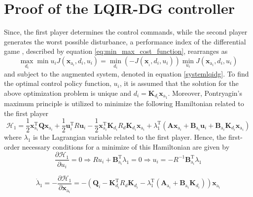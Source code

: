 \documentclass[3p]{elsarticle}
\begin{document}
\section{Proof of the LQIR-DG controller}
Since, the first player determines the control commands, while the second player generates the worst possible disturbance, a performance index of the differential game \cite{book_gth}, described by equation \eqref{eq:min_max_cost_function}, rearranges as
\begin{equation}
    \max_{d_i}\min{u_i} J(\mathbf{x}_{\mathrm{a}_i}, d_i, u_i) = \min_{d_i}\left(-J(\mathbf{x}_{_i}, d_i, u_i)\right)\min_{u_i}J(\mathbf{x}_{\mathrm{a}_i}, d_i, u_i)
\end{equation}
and subject to the augmented system, denoted in equation \eqref{systemlqidg}. To find the optimal control policy function, $u_i$, it is assumed that the solution for the above optimization problem is unique and $d_i = \mathbf{K}_{d_i}\mathbf{x}_{\mathrm{a}_1}$.
Moreover, Pontryagin's maximum principle \cite{kirk2004optimal} is utilized to minimize the following Hamiltonian related to the first player
\begin{equation}
    \mathcal{H}_1 = \dfrac{1}{2}\mathbf{x}_{\mathrm{a}_i}^\mathrm{T} \mathbf{Q} \mathbf{x}_{\mathrm{a}_i} + \dfrac{1}{2}\mathbf{u}_i^\mathrm{T} R \mathbf{u}_i - \dfrac{1}{2}\mathbf{x}_{\mathrm{a}_i}^\mathrm{T} \mathbf{K}_{d_i} R_{d} \mathbf{K}_{d_i}  \mathbf{x}_{\mathrm{a}_i} + \lambda_1^\mathrm{T}(\mathbf{A}\mathbf{x}_{\mathrm{a}_i} + \mathbf{B}_{\mathrm{a}_i}\mathbf{u}_i + \mathbf{B}_{\mathrm{a}_i}\mathbf{K}_{d_i}\mathbf{x}_{\mathrm{a}_i}) \end{equation}
    where $\lambda_1$ is the Lagrangian variable related to the first player. Hence, the first-order necessary conditions for a minimize of this Hamiltonian are given by
    \begin{equation}\label{eq:Hamiltonian_u}
        \dfrac{\partial \mathcal{H}_1}{\partial u_i} = 0 \Rightarrow Ru_i + \mathbf{B}_{\mathrm{a}_i}^\mathrm{T}\lambda_1 = 0 \Rightarrow u_i = -R^{-1}\mathbf{B}_{\mathrm{a}_i}^\mathrm{T}\lambda_1
    \end{equation}

\begin{equation}\label{eq:Hamiltonian_lambda}
    \dot{\lambda}_1 = -\dfrac{\partial \mathcal{H}_1}{\partial \mathbf{x}_{\mathrm{a}_i}} = -( \mathbf{Q}_i - 
    \mathbf{K}_{d_i}^\mathrm{T} R_{d} \mathbf{K}_{d_i} -\lambda_1^\mathrm{T}(\mathbf{A}_{\mathrm{a}_i} + \mathbf{B}_{\mathrm{a}_i}\mathbf{K}_{d_i})) \mathbf{x}_{\mathrm{a}_i} 
\end{equation}
\end{document}
